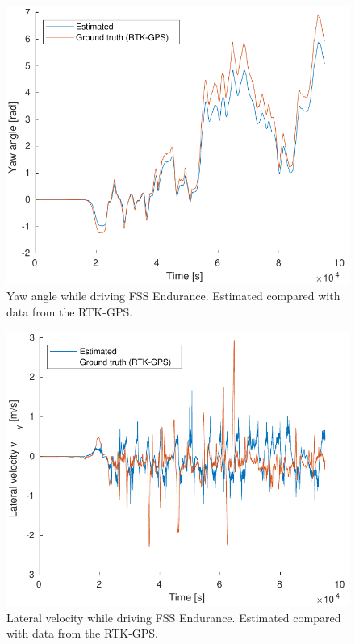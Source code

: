 \begin{figure}
    \centering
    \includegraphics[width=0.8\linewidth]{0_Images/6_Results/yawFSSEndurance.pdf}
    \caption[Yaw angle while driving FSS Endurance.]
    {Yaw angle while driving FSS Endurance. Estimated compared with data from the RTK-GPS.}
    \label{Fig:YawFSSEndurance}
\end{figure}

\begin{figure}
    \centering
    \includegraphics[width=0.8\linewidth]{0_Images/6_Results/vyFSSEndurance.pdf}
    \caption[Lateral velocity while driving FSS Endurance.]
    {Lateral velocity while driving FSS Endurance. Estimated compared with data from the RTK-GPS.}
    \label{Fig:VyFSSEndurance}
\end{figure}

